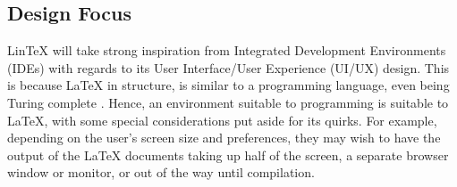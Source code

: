 \documentclass[11pt,titlepage,dvipsnames,table,xcdraw]{article}
\begin{document}
\subsection{Design Focus}
LinTeX will take strong inspiration from Integrated Development Environments (IDEs) with regards to its User Interface/User Experience (UI/UX) design. This is because LaTeX in structure, is similar to a programming language, even being Turing complete \cite{latexturingcomplete}. Hence, an environment suitable to programming is suitable to LaTeX, with some special considerations put aside for its quirks. For example, depending on the user's screen size and preferences, they may wish to have the output of the LaTeX documents taking up half of the screen, a separate browser window or monitor, or out of the way until compilation. 

\end{document}

